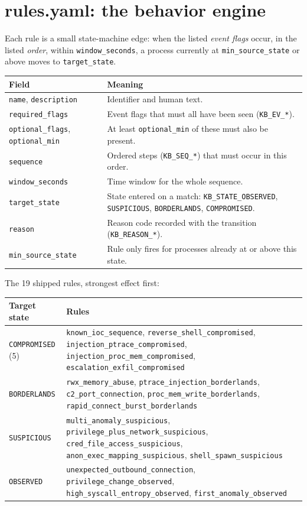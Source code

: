 \section{rules.yaml: the behavior engine}
Each rule is a small state-machine edge: when the listed \emph{event flags} occur, in the listed \emph{order}, within
\texttt{window\_seconds}, a process currently at \texttt{min\_source\_state} or above moves to
\texttt{target\_state}.
\begin{center}\small
\begin{tabularx}{\textwidth}{@{}L{3.7cm}Y@{}}
\toprule
\textbf{Field} & \textbf{Meaning}\\
\midrule
\texttt{name}, \texttt{description} & Identifier and human text.\\
\texttt{required\_flags} & Event flags that must all have been seen (\texttt{KB\_EV\_*}).\\
\texttt{optional\_flags}, \texttt{optional\_min} & At least \texttt{optional\_min} of these must also be present.\\
\texttt{sequence} & Ordered steps (\texttt{KB\_SEQ\_*}) that must occur in this order.\\
\texttt{window\_seconds} & Time window for the whole sequence.\\
\texttt{target\_state} & State entered on a match: \texttt{KB\_STATE\_OBSERVED}, \texttt{SUSPICIOUS}, \texttt{BORDERLANDS}, \texttt{COMPROMISED}.\\
\texttt{reason} & Reason code recorded with the transition (\texttt{KB\_REASON\_*}).\\
\texttt{min\_source\_state} & Rule only fires for processes already at or above this state.\\
\bottomrule
\end{tabularx}
\end{center}
The 19 shipped rules, strongest effect first:
\begin{center}\small
\begin{tabularx}{\textwidth}{@{}L{3.2cm}Y@{}}
\toprule
\textbf{Target state} & \textbf{Rules}\\
\midrule
\texttt{COMPROMISED} (5) & \texttt{known\_ioc\_sequence}, \texttt{reverse\_shell\_compromised}, \texttt{injection\_ptrace\_compromised}, \texttt{injection\_proc\_mem\_compromised}, \texttt{escalation\_exfil\_compromised}\\
\texttt{BORDERLANDS} & \texttt{rwx\_memory\_abuse}, \texttt{ptrace\_injection\_borderlands}, \texttt{c2\_port\_connection}, \texttt{proc\_mem\_write\_borderlands}, \texttt{rapid\_connect\_burst\_borderlands}\\
\texttt{SUSPICIOUS} & \texttt{multi\_anomaly\_suspicious}, \texttt{privilege\_plus\_network\_suspicious}, \texttt{cred\_file\_access\_suspicious}, \texttt{anon\_exec\_mapping\_suspicious}, \texttt{shell\_spawn\_suspicious}\\
\texttt{OBSERVED} & \texttt{unexpected\_outbound\_connection}, \texttt{privilege\_change\_observed}, \texttt{high\_syscall\_entropy\_observed}, \texttt{first\_anomaly\_observed}\\
\bottomrule
\end{tabularx}
\end{center}
